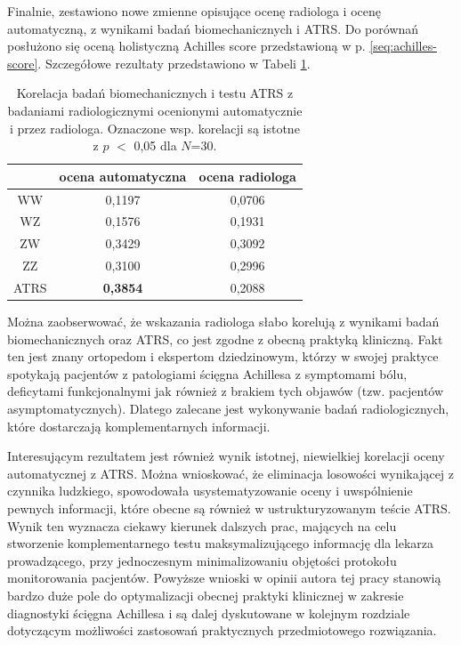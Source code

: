 Finalnie, zestawiono nowe zmienne opisujące ocenę radiologa i ocenę automatyczną, z wynikami badań biomechanicznych i ATRS. Do porównań posłużono się oceną holistyczną Achilles score przedstawioną w p. \ref{seq:achilles-score}. Szczegółowe rezultaty przedstawiono w Tabeli \ref{tab:bioATRSvspredGT}.
\vspace{10px}
\begin{table}[h]
	\centering
	\setlength{\tabcolsep}{3pt}
	\setlength\extrarowheight{2pt}
	\caption{Korelacja badań biomechanicznych i testu ATRS z badaniami radiologicznymi ocenionymi automatycznie i przez radiologa. Oznaczone wsp. korelacji są istotne z $p$ $<$ 0,05 dla $N$=30.}
	\label{tab:bioATRSvspredGT}
	\begin{tabular}{c|c|c}
		&ocena automatyczna&ocena radiologa \\
		\hline \hline
		WW&0,1197&0,0706\\
		\hline
		WZ&0,1576&0,1931\\
		\hline
		ZW&0,3429&0,3092\\
		\hline
		ZZ&0,3100&0,2996\\
		\hline
		ATRS&\textbf{0,3854}&0,2088\\
		
	
	\end{tabular}
\end{table}

Można zaobserwować, że wskazania radiologa słabo korelują z wynikami badań biomechanicznych oraz ATRS, co jest zgodne z obecną praktyką kliniczną. Fakt ten jest znany ortopedom i ekspertom dziedzinowym, którzy w swojej praktyce spotykają pacjentów z patologiami ścięgna Achillesa z symptomami bólu, deficytami funkcjonalnymi jak również z brakiem tych objawów (tzw. pacjentów asymptomatycznych). Dlatego zalecane jest wykonywanie badań radiologicznych, które dostarczają komplementarnych informacji. 

Interesującym rezultatem jest również wynik istotnej, niewielkiej korelacji oceny automatycznej z ATRS. Można wnioskować, że eliminacja losowości wynikającej z czynnika ludzkiego, spowodowała usystematyzowanie oceny i uwspólnienie pewnych informacji, które obecne są również w ustrukturyzowanym teście ATRS. Wynik ten wyznacza ciekawy kierunek dalszych prac, mających na celu stworzenie komplementarnego testu maksymalizującego informację dla lekarza prowadzącego, przy jednoczesnym minimalizowaniu objętości protokołu monitorowania pacjentów. Powyższe wnioski w opinii autora tej pracy stanowią bardzo duże pole do optymalizacji obecnej praktyki klinicznej w zakresie diagnostyki ścięgna Achillesa i są dalej dyskutowane w kolejnym rozdziale dotyczącym możliwości zastosowań praktycznych przedmiotowego rozwiązania.

